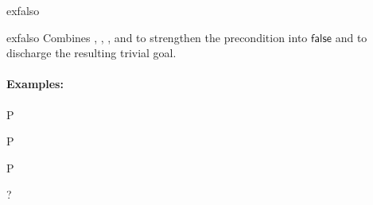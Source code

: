 \begin{tactic}{exfalso}
  \begin{tsyntax}{exfalso}
  Combines , , ,
   and  to strengthen the precondition
  into $\mathsf{false}$ and to discharge the resulting trivial goal.

  \paragraph{Examples:}\strut
  
  \begin{cmathpar}
    {P \Rightarrow {}}
    {}

    {P \Rightarrow {}}
    {}

    {P \Rightarrow {}}
    {}
  \end{cmathpar}
  ?
  \end{tsyntax}
\end{tactic}
